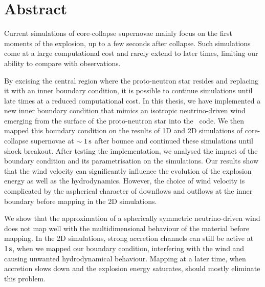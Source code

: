 \chapter*{\hfill{\centering Abstract}\hfill}
\vspace{1.5cm}


\begin{center}

Current simulations of core-collapse supernovae mainly focus on the first moments of the explosion, up to a few seconds after collapse. Such simulations come at a large computational cost and rarely extend to later times, limiting our ability to compare with observations.

By excising the central region where the proto-neutron star resides and replacing it with an inner boundary condition, it is possible to continue simulations until late times at a reduced computational cost. In this thesis, we have implemented a new inner boundary condition that mimics an isotropic neutrino-driven wind emerging from the surface of the proto-neutron star into the \flash\ code. We then mapped this boundary condition on the results of 1D and 2D simulations of core-collapse supernovae at \(\sim1\,\mathrm{s}\) after bounce and continued these simulations until shock breakout. After testing the implementation, we analysed the impact of the boundary condition and its parametrisation on the simulations. Our results show that the wind velocity can significantly influence the evolution of the explosion energy as well as the hydrodynamics. However, the choice of wind velocity is complicated by the aspherical character of downflows and outflows at the inner boundary before mapping in the 2D simulations.

We show that the approximation of a spherically symmetric neutrino-driven wind does not map well with the multidimensional behaviour of the material before mapping. In the 2D simulations, strong accretion channels can still be active at \(1\,\mathrm{s}\), when we mapped our boundary condition, interfering with the wind and causing unwanted hydrodynamical behaviour. Mapping at a later time, when accretion slows down and the explosion energy saturates, should mostly eliminate this problem.

\end{center}